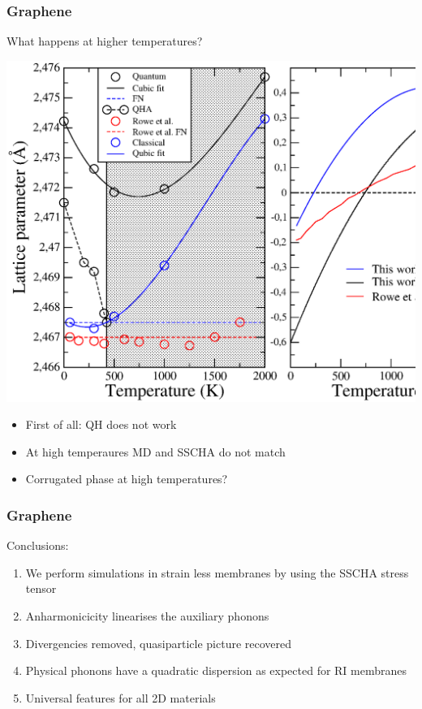 \documentclass{beamer}
\begin{document}
\begin{frame}

\frametitle{Graphene}
What happens at higher temperatures?
\begin{center}
 \includegraphics[width=0.60\linewidth]{Pictures/Graphene/lattice.eps}
\end{center}
\begin{itemize}
\item First of all: QH does not work
\item At high temperaures MD and SSCHA do not match
\item Corrugated phase at high temperatures?
\end{itemize}

\end{frame}


\begin{frame}

 \frametitle{Graphene}
Conclusions:
 \begin{enumerate}
  \item We perform simulations in strain less membranes by using the SSCHA stress tensor
  \item Anharmonicicity linearises the auxiliary phonons 
  \item Divergencies removed, quasiparticle picture recovered
  \item Physical phonons have a quadratic dispersion as expected for RI membranes
  \item Universal features for all 2D materials
 \end{enumerate}

\end{frame}

\end{document}
